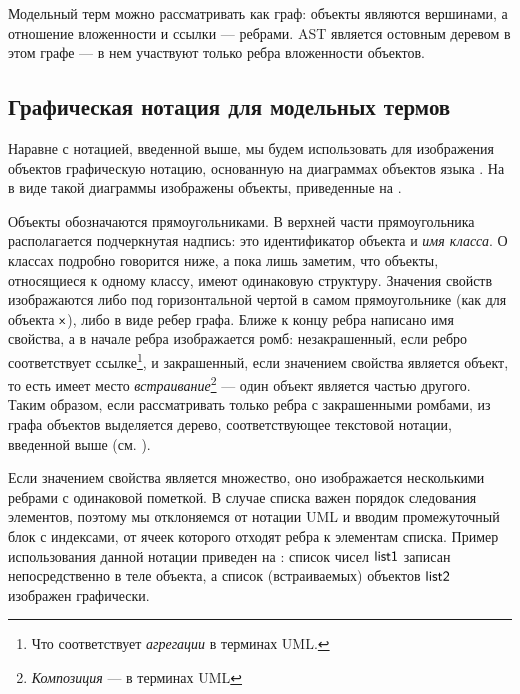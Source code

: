 Модельный терм можно рассматривать как граф: объекты являются вершинами, а отношение вложенности и ссылки --- ребрами. AST является остовным деревом в этом графе --- в нем участвуют только ребра вложенности объектов.

\subsection{Графическая нотация для модельных термов}

Наравне с нотацией, введенной выше, мы будем использовать для изображения объектов графическую нотацию, основанную на диаграммах объектов языка  \cite{UML}. На  в виде такой диаграммы изображены объекты, приведенные на .


Объекты обозначаются прямоугольниками. В верхней части прямоугольника располагается подчеркнутая надпись: это идентификатор объекта и \emph{имя класса}. О классах подробно говорится ниже, а пока лишь заметим, что объекты, относящиеся к одному классу, имеют одинаковую структуру. Значения свойств изображаются либо под горизонтальной чертой в самом прямоугольнике (как для объекта $\mathsf{x}$), либо в виде ребер графа. Ближе к концу ребра написано имя свойства, а в начале ребра изображается ромб: незакрашенный, если ребро соответствует ссылке\footnote{Что соответствует \emph{агрегации} в терминах UML.}, и закрашенный, если значением свойства является объект, то есть имеет место \emph{встраивание}\footnote{\emph{Композиция} --- в терминах UML} --- один объект является частью другого. Таким образом, если рассматривать только ребра с закрашенными ромбами, из графа объектов выделяется дерево, соответствующее текстовой нотации, введенной выше (см. ).


Если значением свойства является множество, оно изображается несколькими ребрами с одинаковой пометкой. В случае списка важен порядок следования элементов, поэтому мы отклоняемся от нотации UML и вводим промежуточный блок с индексами, от ячеек которого отходят ребра к элементам списка. Пример использования данной нотации приведен на : список чисел $\mathsf{list1}$ записан непосредственно в теле объекта, а список (встраиваемых) объектов $\mathsf{list2}$ изображен графически.

